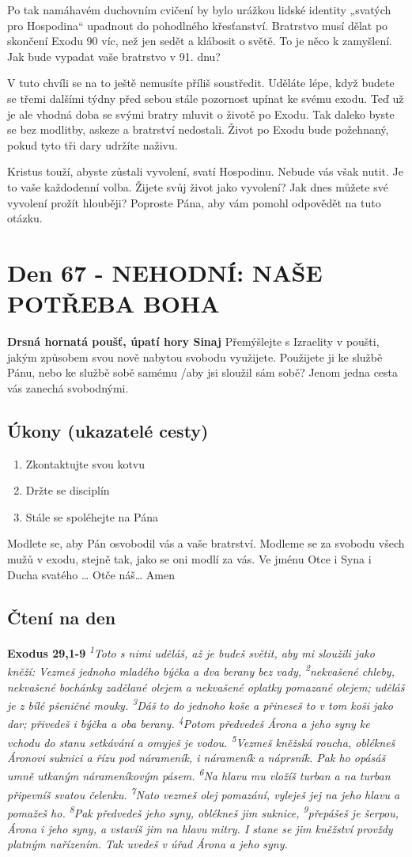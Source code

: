 \documentclass[11pt]{article}
\newcommand{\zacatekDesatyTyden}{
\textbf{Drsná hornatá poušť, úpatí hory Sinaj} \newline 
Přemýšlejte s Izraelity v poušti, jakým způsobem svou nově nabytou svobodu využijete. Použijete ji ke službě Pánu, nebo ke službě sobě samému /aby jsi sloužil sám sobě? Jenom jedna cesta vás zanechá svobodnými.

\subsection*{Úkony (ukazatelé cesty)}
\begin{enumerate}
  \item Zkontaktujte svou kotvu
  \item Držte se disciplín
  \item Stále se spoléhejte na Pána
\end{enumerate}
Modlete se, aby Pán osvobodil vás a vaše bratrství. \newline
Modleme se za svobodu všech mužů v exodu, stejně tak, jako se oni modlí za vás.\newline
Ve jménu Otce i Syna i Ducha svatého …  Otče náš… Amen
}
\begin{document}
Po tak namáhavém duchovním cvičení by bylo urážkou lidské identity „svatých pro Hospodina“ upadnout do
pohodlného křesťanství. Bratrstvo musí dělat po skončení Exodu 90 víc, než jen sedět a klábosit o světě. To je něco
k zamyšlení. Jak bude vypadat vaše bratrstvo v 91. dnu?

V tuto chvíli se na to ještě nemusíte příliš soustředit. Uděláte lépe, když budete se třemi dalšími týdny před sebou stále
pozornost upínat ke svému exodu. Teď už je ale vhodná doba se svými bratry mluvit o životě po Exodu. Tak daleko
byste se bez modlitby, askeze a bratrství nedostali. Život po Exodu bude požehnaný, pokud tyto tři dary udržíte naživu.

Kristus touží, abyste zůstali vyvolení, svatí Hospodinu. Nebude vás však nutit. Je to vaše každodenní volba. Žijete svůj
život jako vyvolení? Jak dnes můžete své vyvolení prožít hlouběji? Poproste Pána, aby vám pomohl odpovědět na tuto
otázku.





\newpage
\section{Den 67 - NEHODNÍ: NAŠE POTŘEBA BOHA}
\zacatekDesatyTyden
\subsection*{Čtení na den}
\textbf{Exodus 29,1-9}
\newline
\textit{
\textsuperscript{1}Toto s nimi uděláš, až je budeš světit, aby mi sloužili jako kněží: Vezmeš jednoho mladého býčka a dva berany bez vady,
\textsuperscript{2}nekvašené chleby, nekvašené bochánky zadělané olejem a nekvašené oplatky pomazané olejem; uděláš je z bílé pšeničné mouky.
\textsuperscript{3}Dáš to do jednoho koše a přineseš to v tom koši jako dar; přivedeš i býčka a oba berany.
\textsuperscript{4}Potom předvedeš Árona a jeho syny ke vchodu do stanu setkávání a omyješ je vodou.
\textsuperscript{5}Vezmeš kněžská roucha, oblékneš Áronovi suknici a řízu pod nárameník, i nárameník a náprsník. Pak ho opásáš umně utkaným nárameníkovým pásem.
\textsuperscript{6}Na hlavu mu vložíš turban a na turban připevníš svatou čelenku.
\textsuperscript{7}Nato vezmeš olej pomazání, vyleješ jej na jeho hlavu a pomažeš ho.
\textsuperscript{8}Pak předvedeš jeho syny, oblékneš jim suknice,
\textsuperscript{9}přepášeš je šerpou, Árona i jeho syny, a vstavíš jim na hlavu mitry. I stane se jim kněžství provždy platným nařízením. Tak uvedeš v úřad Árona a jeho syny.
}
\end{document}
